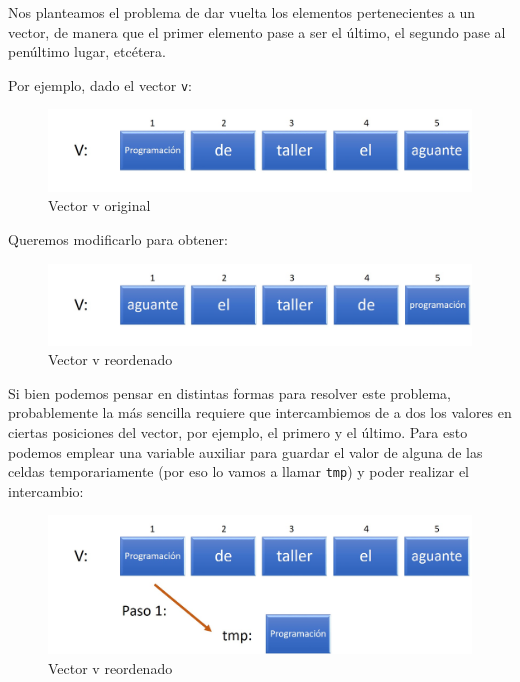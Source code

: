 \documentclass[]{book}
\begin{document}
Nos planteamos el problema de dar vuelta los elementos pertenecientes a un vector, de manera que el primer elemento pase a ser el último, el segundo pase al penúltimo lugar, etcétera.

Por ejemplo, dado el vector \texttt{v}:

\begin{figure}

{\centering \includegraphics[width=0.8\linewidth]{images/14_invertir1} 

}

\caption{Vector v original}\label{fig:inv1}
\end{figure}

Queremos modificarlo para obtener:

\begin{figure}

{\centering \includegraphics[width=0.8\linewidth]{images/15_invertir1} 

}

\caption{Vector v reordenado}\label{fig:inv2}
\end{figure}

Si bien podemos pensar en distintas formas para resolver este problema, probablemente la más sencilla requiere que intercambiemos de a dos los valores en ciertas posiciones del vector, por ejemplo, el primero y el último. Para esto podemos emplear una variable auxiliar para guardar el valor de alguna de las celdas temporariamente (por eso lo vamos a llamar \texttt{tmp}) y poder realizar el intercambio:

\begin{figure}

{\centering \includegraphics[width=0.8\linewidth]{images/16_invertir} 

}

\caption{Vector v reordenado}\label{fig:inv3}
\end{figure}
\end{document}
